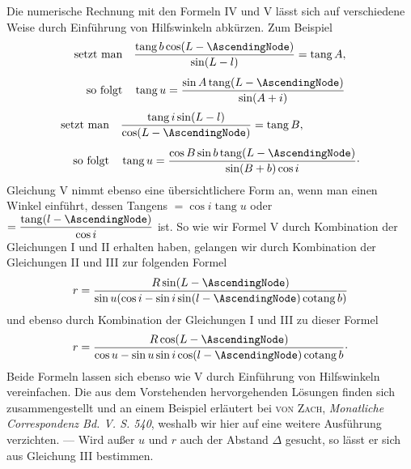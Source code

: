 Die numerische Rechnung mit den Formeln IV und V lässt sich auf verschiedene Weise durch Einführung von Hilfswinkeln abkürzen. Zum Beispiel
\[
\begin{aligned}
\text{setzt man}\quad &\frac{\operatorname{tang}b\cos(L-\AscendingNode)}{\sin(L-l)}=\operatorname{tang}A,\\[.4em]
\text{so folgt}\quad &\operatorname{tang}u=\frac{\sin A\operatorname{tang}(L-\AscendingNode)}{\sin(A+i)}
\end{aligned}
\]
\[
\begin{aligned}
\text{setzt man}\quad &\frac{\operatorname{tang}i\sin(L-l)}{\cos(L-\AscendingNode)}=\operatorname{tang}B,\\[.4em]
\text{so folgt}\quad &\operatorname{tang}u=\frac{\cos B\sin b\operatorname{tang}(L-\AscendingNode)}{\sin(B+b)\cos i}\mathpunct{\cdot}
\end{aligned}
\]
\noindent Gleichung V nimmt ebenso eine übersichtlichere Form an, wenn man einen Winkel einführt, dessen Tangens $=\cos i\operatorname{tang}u$ oder $=\dfrac{\operatorname{tang}(l-\AscendingNode)}{\cos i}$ ist. So wie wir Formel V durch Kombination der Gleichungen I und II erhalten haben, gelangen wir durch Kombination der Gleichungen II und III zur folgenden Formel
\[
r=\frac{R\sin(L-\AscendingNode)}{\sin u(\cos i-\sin i\sin(l-\AscendingNode)\operatorname{cotang}b)}
\]
\noindent und ebenso durch Kombination der Gleichungen I und III zu dieser Formel
\[
r=\frac{R\cos(L-\AscendingNode)}{\cos u-\sin u\sin i\cos(l-\AscendingNode)\operatorname{cotang}b}\mathpunct{\cdot}
\]
\noindent Beide Formeln lassen sich ebenso wie V durch Einführung von Hilfswinkeln vereinfachen. Die aus dem Vorstehenden hervorgehenden Lösungen finden sich zusammengestellt und an einem Beispiel erläutert bei \textsc{von Zach}, \emph{Monatliche Correspondenz Bd. V. S. 540}\HistoricalNoteEight{Juni 1802. Band VI. S. 87.]}, weshalb wir hier auf eine weitere Ausführung verzichten. — Wird außer $u$ und $r$ auch der Abstand $\Delta$ gesucht, so lässt er sich aus Gleichung III bestimmen.

